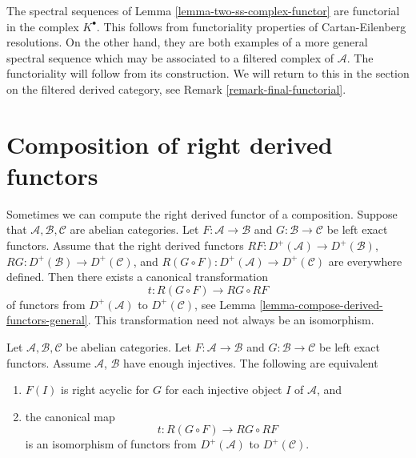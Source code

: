 \begin{remark}
\label{remark-functorial-ss}
The spectral sequences of Lemma \ref{lemma-two-ss-complex-functor}
are functorial in the complex $K^\bullet$. This follows from functoriality
properties of Cartan-Eilenberg resolutions. On the other hand, they are
both examples of a more general spectral sequence which may be associated
to a filtered complex of $\mathcal{A}$. The functoriality will follow from
its construction. We will return to this in the section on the filtered
derived category, see Remark \ref{remark-final-functorial}.
\end{remark}










\section{Composition of right derived functors}
\label{section-composition-right-derived-functors}

\noindent
Sometimes we can compute the right derived functor of a composition.
Suppose that $\mathcal{A}, \mathcal{B}, \mathcal{C}$ are abelian categories.
Let $F : \mathcal{A} \to \mathcal{B}$ and $G : \mathcal{B} \to \mathcal{C}$
be left exact functors. Assume that the right derived functors
$RF : D^{+}(\mathcal{A}) \to D^{+}(\mathcal{B})$,
$RG : D^{+}(\mathcal{B}) \to D^{+}(\mathcal{C})$, and
$R(G \circ F) : D^{+}(\mathcal{A}) \to D^{+}(\mathcal{C})$
are everywhere defined. Then there exists a canonical transformation
$$
t : R(G \circ F) \longrightarrow RG \circ RF
$$
of functors from $D^{+}(\mathcal{A})$ to $D^{+}(\mathcal{C})$, see
Lemma \ref{lemma-compose-derived-functors-general}.
This transformation need not always be an isomorphism.

\begin{lemma}
\label{lemma-compose-derived-functors}
Let $\mathcal{A}, \mathcal{B}, \mathcal{C}$ be abelian categories.
Let $F : \mathcal{A} \to \mathcal{B}$ and $G : \mathcal{B} \to \mathcal{C}$
be left exact functors. Assume $\mathcal{A}$, $\mathcal{B}$ have
enough injectives. The following are equivalent
\begin{enumerate}
\item $F(I)$ is right acyclic for $G$ for each injective object $I$
of $\mathcal{A}$, and
\item the canonical map
$$
t : R(G \circ F) \longrightarrow RG \circ RF
$$
is an isomorphism of functors from $D^{+}(\mathcal{A})$ to $D^{+}(\mathcal{C})$.
\end{enumerate}
\end{lemma}

